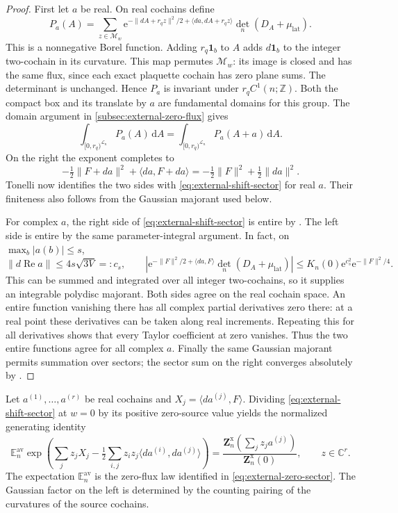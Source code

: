 \documentclass[11pt,letterpaper,reqno]{amsart}
\newcommand{\C}{\mathbb C}
\newcommand{\Z}{\mathbb Z}
\newcommand{\E}{\mathbb E}
\newcommand{\dd}{\mathrm d}
\begin{document}
\begin{proof}
First let $a$ be real. On real cochains define
\[
 P_a(A)=\sum_{z\in\mathcal M_w}
  \mathrm e^{-\|dA+r_qz\|^2/2+\langle da,dA+r_qz\rangle}
                            \det_n(D_A+\mu_{\mathrm{lat}}).
\]
This is a nonnegative Borel function. Adding
$r_q\mathbf1_b$ to $A$ adds $d\mathbf1_b$ to the
integer two-cochain in its curvature. This map
permutes $\mathcal M_w$: its image is closed
and has the same flux, since each exact plaquette
cochain has zero plane sums. The determinant
is unchanged. Hence $P_a$ is invariant under
$r_qC^1(n;\Z)$. Both the compact box and its
translate by $a$ are fundamental domains for
this group. The domain argument in
\cref{subsec:external-zero-flux} gives
\[
 \int_{[0,r_q)^{\mathcal L_n}}P_a(A)\,\dd A
        =\int_{[0,r_q)^{\mathcal L_n}}P_a(A+a)\,\dd A.
\]
On the right the exponent completes to
\[
 -\tfrac12\|F+da\|^2+\langle da,F+da\rangle
                  =-\tfrac12\|F\|^2+\tfrac12\|da\|^2.
\]
Tonelli now identifies the two sides with
\eqref{eq:external-shift-sector} for real $a$.
Their finiteness also follows from the Gaussian
majorant used below.

For complex $a$, the right side of
\eqref{eq:external-shift-sector} is entire by
.
The left side is entire by the same
parameter-integral argument. In fact, on
$\max_b|a(b)|\le s$,
\[
 \|d\operatorname{Re}a\|\le4s\sqrt{3V}=:c_s,
 \qquad
 \left|\mathrm e^{-\|F\|^2/2+\langle da,F\rangle}
                            \det_n(D_A+\mu_{\mathrm{lat}})\right|
                  \le K_n(0)\mathrm e^{c_s^2}\mathrm e^{-\|F\|^2/4}.
\]
This can be summed and integrated over all integer
two-cochains, so it supplies an integrable polydisc
majorant. Both sides agree on the real cochain
space. An entire function vanishing there has
all complex partial derivatives zero there:
at a real point these derivatives can be taken
along real increments. Repeating this for all
derivatives shows that every Taylor coefficient
at zero vanishes. Thus the two entire functions
agree for all complex $a$.
Finally the same Gaussian majorant permits
summation over sectors; the sector sum on the
right converges absolutely by
.
\end{proof}

Let $a^{(1)},\ldots,a^{(r)}$ be real cochains and
$X_j=\langle da^{(j)},F\rangle$. Dividing
\eqref{eq:external-shift-sector} at $w=0$ by its
positive zero-source value yields the normalized
generating identity
\begin{equation}\label{eq:external-generating-general}
 \E_n^{\mathrm{av}}\exp\left(
       \sum_jz_jX_j-\tfrac12\sum_{i,j}
                  z_iz_j\langle da^{(i)},da^{(j)}\rangle\right)
 =
 \frac{\mathbf Z_n^{\mathrm{x}}(\sum_jz_ja^{(j)})}
                         {\mathbf Z_n^{\mathrm{x}}(0)},
                                                   \qquad z\in\C^r.
\end{equation}
The expectation $\E_n^{\mathrm{av}}$ is the zero-flux
law identified in \eqref{eq:external-zero-sector}.
The Gaussian factor on the left is determined by
the counting pairing of the curvatures of the
source cochains.
\end{document}

